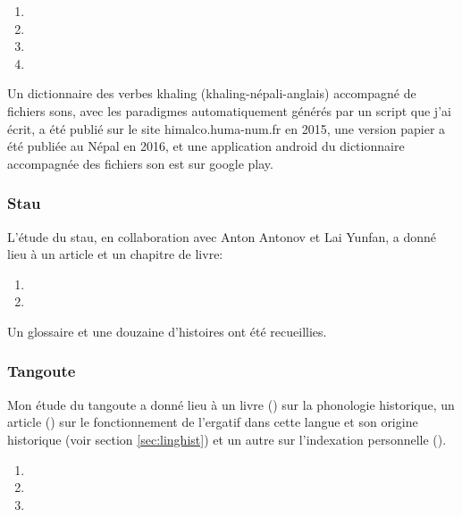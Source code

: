 \documentclass[oldfontcommands,oneside,a4paper,11pt]{article}
\begin{document}
\begin{enumerate}
\item {}
\item {}
\item {}
\item {}
\end{enumerate} 

Un dictionnaire des verbes khaling (khaling-népali-anglais) accompagné de fichiers sons, avec les paradigmes automatiquement générés par un script que j'ai écrit, a été publié sur le site  himalco.huma-num.fr en 2015, une version papier a été publiée au Népal en 2016, et une application android du dictionnaire accompagnée des fichiers son est sur google play.

\subsubsection{Stau}
L'étude du stau, en collaboration avec Anton Antonov et Lai Yunfan, a donné lieu à un article et un chapitre de livre:

\begin{enumerate}
\item {}
\item {}
\end{enumerate} 

Un glossaire et une douzaine d'histoires ont été recueillies.

\subsubsection{Tangoute}
Mon étude du tangoute a donné lieu à un livre (\citealt{jacques14esquisse}) sur la phonologie historique, un article (\citealt{jacques14ergative}) sur le fonctionnement de l'ergatif dans cette langue et son origine historique (voir section \ref{sec:linghist}) et un autre sur l'indexation personnelle  (\citealt{jacques16th}).

\begin{enumerate}
 \item  {}
 \item  {}
 \item {}
\end{enumerate} 
 
\end{document}
